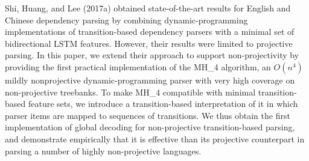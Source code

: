 Shi, Huang, and Lee (2017a) obtained state-of-the-art results for English and Chinese dependency parsing by combining dynamic-programming implementations of transition-based dependency parsers with a minimal set of bidirectional LSTM features. However, their results were limited to projective parsing. In this paper, we extend their approach to support non-projectivity by providing the first practical implementation of the MH\_4 algorithm, an $O(n^4)$ mildly nonprojective dynamic-programming parser with very high coverage on non-projective treebanks. To make MH\_4 compatible with minimal transition-based feature sets, we introduce a transition-based interpretation of it in which parser items are mapped to sequences of transitions. We thus obtain the first implementation of global decoding for non-projective transition-based parsing, and demonstrate empirically that it is effective than its projective counterpart in parsing a number of highly non-projective languages.

